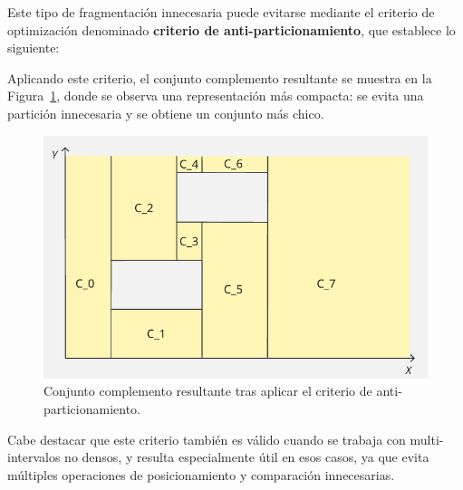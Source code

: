 Este tipo de fragmentación innecesaria puede evitarse mediante el criterio de optimización denominado \textbf{criterio de anti-particionamiento}, que establece lo siguiente:

\begin{center}
\end{center}


Aplicando este criterio, el conjunto complemento resultante se muestra en la Figura~\ref{fig:compleNue}, donde se observa una representación más compacta: se evita una partición innecesaria y se obtiene un conjunto más chico.

\begin{figure}[htbp]
    \centering
    \includegraphics[width=0.8\linewidth]{figures/Optimazaciones/Complement/complNue.png}
    \caption{Conjunto complemento resultante tras aplicar el criterio de anti-particionamiento.}
    \label{fig:compleNue}
\end{figure}

Cabe destacar que este criterio también es válido cuando se trabaja con multi-intervalos no densos, y resulta especialmente útil en esos casos, ya que evita múltiples operaciones de posicionamiento y comparación innecesarias.

